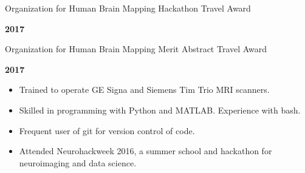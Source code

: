 \documentclass[10pt]{article}
\newcommand{\sectionstyle}{\LARGE \fontfamily{pcr}\selectfont}
\begin{document}
\bigskip

\begin{center}\sectionstyle{HONORS AND AWARDS}\end{center}

\begin{minipage}[t]{.85\linewidth}
\flushleft
\noindent
Organization for Human Brain Mapping Hackathon Travel Award
\end{minipage}
\hfill
\begin{minipage}[t]{.15\linewidth}
\flushright
\noindent
\textsc{\textbf{2017}}
\end{minipage}

\begin{minipage}[t]{.85\linewidth}
\flushleft
\noindent
Organization for Human Brain Mapping Merit Abstract Travel Award
\end{minipage}
\hfill
\begin{minipage}[t]{.15\linewidth}
\flushright
\noindent
\textsc{\textbf{2017}}
\end{minipage}

\bigskip

\begin{center}\sectionstyle{ADDITIONAL TRAINING AND SKILLS}\end{center}

\begin{itemize}[noitemsep, nolistsep, leftmargin=*]
\item
  Trained to operate GE Signa and Siemens Tim Trio MRI scanners.
\item
  Skilled in programming with Python and MATLAB. Experience with bash.
\item
  Frequent user of git for version control of code.
\item
  Attended Neurohackweek 2016, a summer school and hackathon for
  neuroimaging and data science.
\end{itemize}
\end{document}
